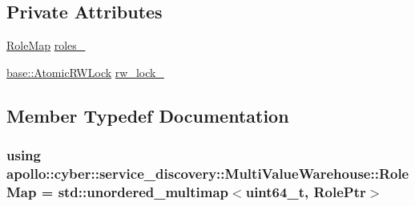 \subsection*{Private Attributes}
\begin{DoxyCompactItemize}
\item 
\hyperlink{classapollo_1_1cyber_1_1service__discovery_1_1MultiValueWarehouse_ac7825b1126cd0ce4193fb1c6de2e1159}{Role\-Map} \hyperlink{classapollo_1_1cyber_1_1service__discovery_1_1MultiValueWarehouse_a8c064f1d708e8c0b905454df8efbf00c}{roles\-\_\-}
\item 
\hyperlink{classapollo_1_1cyber_1_1base_1_1AtomicRWLock}{base\-::\-Atomic\-R\-W\-Lock} \hyperlink{classapollo_1_1cyber_1_1service__discovery_1_1MultiValueWarehouse_a0b5aad2758df1db3e170337b9775abb6}{rw\-\_\-lock\-\_\-}
\end{DoxyCompactItemize}


\subsection{Member Typedef Documentation}
\hypertarget{classapollo_1_1cyber_1_1service__discovery_1_1MultiValueWarehouse_ac7825b1126cd0ce4193fb1c6de2e1159}{
\subsubsection[{Role\-Map}]{\setlength{\rightskip}{0pt plus 5cm}using {\bf apollo\-::cyber\-::service\-\_\-discovery\-::\-Multi\-Value\-Warehouse\-::\-Role\-Map} =  std\-::unordered\-\_\-multimap$<$uint64\-\_\-t, {\bf Role\-Ptr}$>$}}\label{classapollo_1_1cyber_1_1service__discovery_1_1MultiValueWarehouse_ac7825b1126cd0ce4193fb1c6de2e1159}


